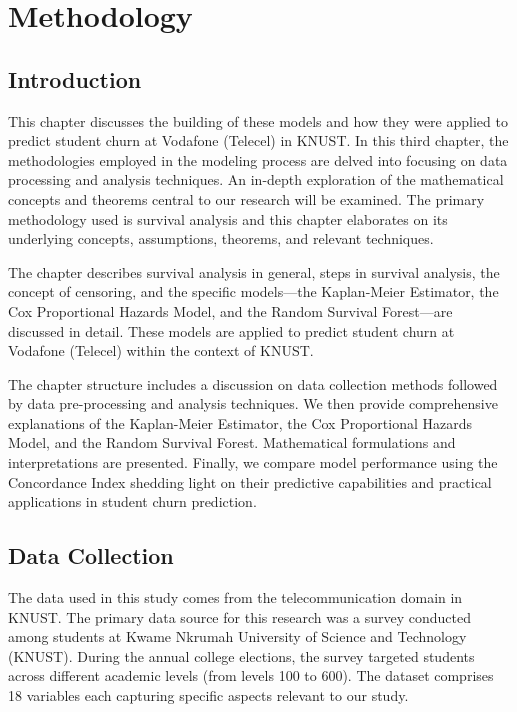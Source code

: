 \documentclass[12pt]{report}
\begin{document}
\chapter{Methodology}

\section{Introduction}
This chapter discusses the building of these models and how they were applied to predict student churn at Vodafone (Telecel) in KNUST. In this third chapter, the methodologies employed in the modeling process are delved into focusing on data processing and analysis techniques. An in-depth exploration of the mathematical concepts and theorems central to our research will be examined. The primary methodology used is survival analysis and this chapter elaborates on its underlying concepts, assumptions, theorems, and relevant techniques.

The chapter describes survival analysis in general, steps in survival analysis, the concept of censoring, and the specific models—the Kaplan-Meier Estimator, the Cox Proportional Hazards Model, and the Random Survival Forest—are discussed in detail. These models are applied to predict student churn at Vodafone (Telecel) within the context of KNUST.

The chapter structure includes a discussion on data collection methods followed by data pre-processing and analysis techniques. We then provide comprehensive explanations of the Kaplan-Meier Estimator, the Cox Proportional Hazards Model, and the Random Survival Forest. Mathematical formulations and interpretations are presented. Finally, we compare model performance using the Concordance Index shedding light on their predictive capabilities and practical applications in student churn prediction.

\section{Data Collection}

The data used in this study comes from the telecommunication domain in KNUST. The primary data source for this research was a survey conducted among students at Kwame Nkrumah University of Science and Technology (KNUST). During the annual college elections, the survey targeted students across different academic levels (from levels 100 to 600). The dataset comprises 18 variables each capturing specific aspects relevant to our study.
\end{document}
